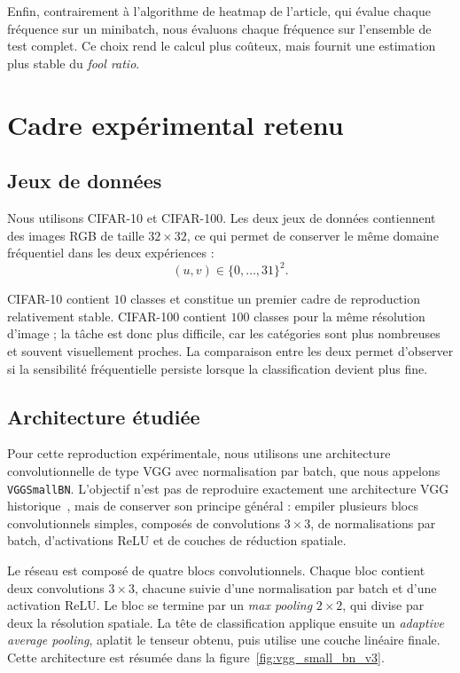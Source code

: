 Enfin, contrairement à l'algorithme de heatmap de l'article, qui évalue chaque fréquence sur un
minibatch, nous évaluons chaque fréquence sur l'ensemble de test complet. Ce choix rend le calcul
plus coûteux, mais fournit une estimation plus stable du \textit{fool ratio}. 

\section{Cadre expérimental retenu}

\subsection{Jeux de données}

Nous utilisons CIFAR-10 et CIFAR-100. Les deux jeux de données contiennent des images RGB de
taille $32\times32$, ce qui permet de conserver le même domaine fréquentiel dans les deux expériences :
\[
    (u,v) \in \{0,\dots,31\}^2.
\]

CIFAR-10 contient $10$ classes et constitue un premier cadre de reproduction relativement stable.
CIFAR-100 contient $100$ classes pour la même résolution d'image ; la tâche est donc plus difficile,
car les catégories sont plus nombreuses et souvent visuellement proches. La comparaison entre les
deux permet d'observer si la sensibilité fréquentielle persiste lorsque la classification devient plus fine.

\subsection{Architecture étudiée}

Pour cette reproduction expérimentale, nous utilisons une architecture convolutionnelle de type VGG
avec normalisation par batch, que nous appelons \texttt{VGGSmallBN}. L'objectif n'est pas de reproduire
exactement une architecture VGG historique~\cite{simonyan2015very}, mais de conserver son principe
général : empiler plusieurs blocs convolutionnels simples, composés de convolutions $3\times3$,
de normalisations par batch, d'activations ReLU et de couches de réduction spatiale.

Le réseau est composé de quatre blocs convolutionnels. Chaque bloc contient deux convolutions
$3\times3$, chacune suivie d'une normalisation par batch et d'une activation ReLU. Le bloc se termine
par un \textit{max pooling} $2\times2$, qui divise par deux la résolution spatiale. La tête de
classification applique ensuite un \textit{adaptive average pooling}, aplatit le tenseur obtenu, puis
utilise une couche linéaire finale. Cette architecture est résumée dans la figure~\ref{fig:vgg_small_bn_v3}.

